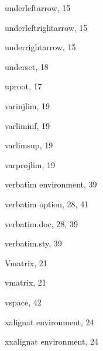 \begin{theindex}
  \indexspace

  \item {\ptt \bslash underleftarrow}, 15
  \item {\ptt \bslash underleftrightarrow}, 15
  \item {\ptt \bslash underrightarrow}, 15
  \item {\ptt \bslash underset}, 18
  \item {\ptt \bslash uproot}, 17

  \indexspace

  \item {\ptt \bslash varinjlim}, 19
  \item {\ptt \bslash varliminf}, 19
  \item {\ptt \bslash varlimsup}, 19
  \item {\ptt \bslash varprojlim}, 19
  \item {\ptt {}verbatim} environment, 39
  \item {\ptt {}verbatim} option, 28, 41
  \item {\ptt {}verbatim.doc}, 28, 39
  \item {\ptt {}verbatim.sty}, 39
  \item {\ptt \bslash Vmatrix}, 21
  \item {\ptt \bslash vmatrix}, 21
  \item {\ptt \bslash vspace}, 42

  \indexspace

  \item {\ptt {}xalignat} environment, 24
  \item {\ptt {}xxalignat} environment, 24

\end{theindex}



\endinput

